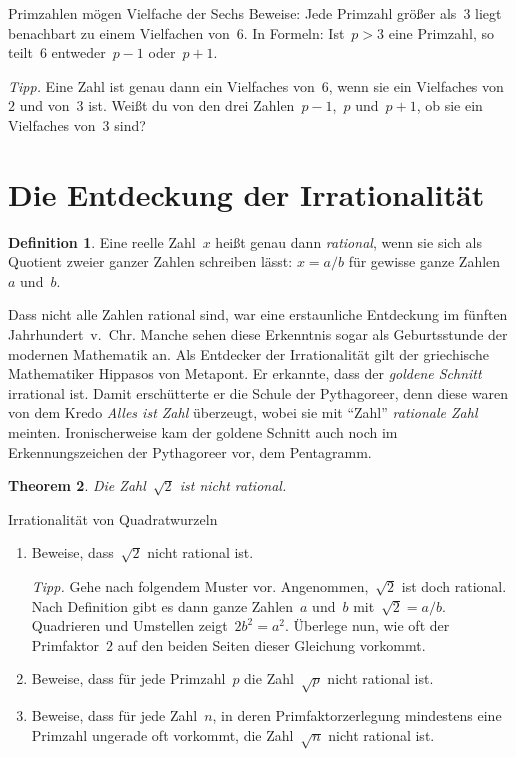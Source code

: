 \documentclass[twoside]{../zirkelblatt1415}
\theoremstyle{definition}
\newtheorem{defn}{Definition}[section]
\theoremstyle{plain}
\newtheorem{thm}[defn]{Theorem}
\theoremstyle{remark}
\begin{document}
\begin{aufgabe}{Primzahlen mögen Vielfache der Sechs}
Beweise: Jede Primzahl größer als~$3$ liegt benachbart zu einem Vielfachen
von~$6$. In Formeln: Ist~$p > 3$ eine Primzahl, so teilt~$6$ entweder~$p-1$
oder~$p+1$.

\emph{Tipp.} Eine Zahl ist genau dann ein Vielfaches von~$6$, wenn sie ein
Vielfaches von~$2$ und von~$3$ ist. Weißt du von den drei Zahlen~$p-1$,~$p$
und~$p+1$, ob sie ein Vielfaches von~$3$ sind?
\end{aufgabe}


\section{Die Entdeckung der Irrationalität}

\begin{defn}Eine reelle Zahl~$x$ heißt genau dann \emph{rational}, wenn sie
sich als Quotient zweier ganzer Zahlen schreiben lässt: $x = a/b$ für gewisse
ganze Zahlen~$a$ und~$b$.\end{defn}

Dass nicht alle Zahlen rational sind, war eine erstaunliche Entdeckung im
fünften Jahrhundert~v.~Chr. Manche sehen diese Erkenntnis sogar als
Geburtsstunde der modernen Mathematik an. Als Entdecker der
Irrationalität gilt der griechische Mathematiker Hippasos von Metapont. Er
erkannte, dass der \emph{goldene Schnitt} irrational ist. Damit erschütterte er
die Schule der Pythagoreer, denn diese waren von dem Kredo \emph{Alles ist
Zahl} überzeugt, wobei sie mit "`Zahl"' \emph{rationale Zahl} meinten.
Ironischerweise kam der goldene Schnitt auch noch im Erkennungszeichen der
Pythagoreer vor, dem Pentagramm.

\begin{thm}Die Zahl~$\sqrt{2}$ ist nicht rational.\end{thm}

\begin{aufgabe}{Irrationalität von Quadratwurzeln}
\begin{enumerate}
\item Beweise, dass~$\sqrt{2}$ nicht rational ist.

\emph{Tipp.} Gehe nach folgendem Muster vor. Angenommen,~$\sqrt{2}$ ist doch
rational. Nach Definition gibt es dann ganze Zahlen~$a$ und~$b$ mit~$\sqrt{2} =
a/b$. Quadrieren und Umstellen zeigt~$2 b^2 = a^2$. Überlege nun, wie oft der
Primfaktor~$2$ auf den beiden Seiten dieser Gleichung vorkommt.

\item Beweise, dass für jede Primzahl~$p$ die Zahl~$\sqrt{p}$ nicht rational
ist.

\item Beweise, dass für jede Zahl~$n$, in deren Primfaktorzerlegung mindestens
eine Primzahl ungerade oft vorkommt, die Zahl~$\sqrt{n}$ nicht rational ist.
\end{enumerate}\fixlistspacing
\end{aufgabe}
\end{document}
